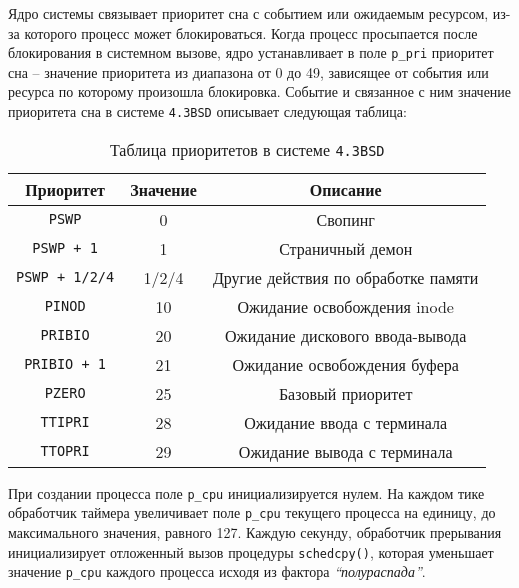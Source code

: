 Ядро системы связывает приоритет сна с событием или ожидаемым ресурсом, из-за которого процесс может блокироваться. Когда процесс просыпается после блокирования в системном вызове, ядро устанавливает в поле \texttt{p\_pri} приоритет сна – значение приоритета из диапазона от 0 до 49, зависящее от события или ресурса по которому произошла блокировка. Событие и связанное с ним значение приоритета сна в системе \texttt{4.3BSD} описывает следующая таблица:

\begin{table}[h]
    \caption{Таблица приоритетов в системе \texttt{4.3BSD}}
    \begin{center}
        \begin{tabular}{ |c|c|c| }
            \hline
            \textbf{Приоритет} & \textbf{Значение} & \textbf{Описание} \\
            \hline
            \texttt{PSWP} & 0 & Свопинг \\
            \hline
            \texttt{PSWP + 1} & 1 & Страничный демон \\
            \hline
            \texttt{PSWP + 1/2/4} & 1/2/4 & Другие действия по обработке памяти \\
            \hline
            \texttt{PINOD} & 10 & Ожидание освобождения inode \\
            \hline
            \texttt{PRIBIO} & 20 & Ожидание дискового ввода-вывода \\
            \hline
            \texttt{PRIBIO + 1} & 21 & Ожидание освобождения буфера \\
            \hline
            \texttt{PZERO} & 25 & Базовый приоритет \\
            \hline
            \texttt{TTIPRI} & 28 & Ожидание ввода с терминала \\
            \hline
            \texttt{TTOPRI} & 29 & Ожидание вывода с терминала \\
            \hline
        \end{tabular}
    \end{center}
\end{table}

При создании процесса поле \texttt{p\_cpu} инициализируется нулем. На каждом тике обработчик таймера увеличивает поле \texttt{p\_cpu} текущего процесса на единицу, до максимального значения, равного 127. Каждую секунду, обработчик прерывания инициализирует отложенный вызов процедуры \texttt{schedcpy()}, которая уменьшает значение \texttt{p\_cpu} каждого процесса исходя из фактора \textit{``полураспада''}.


